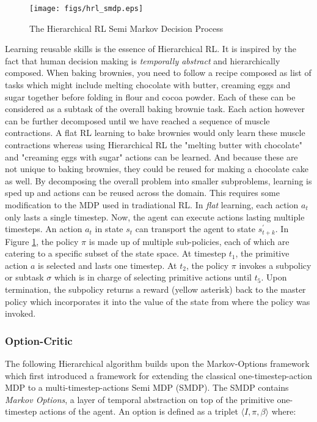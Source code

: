 \documentclass[notitlepage,a4paper,11pt]{article}
\begin{document}
\begin{figure}
	\vspace{-20pt}
	\begin{center}
		\texttt{[image: figs/hrl\_smdp.eps]}
	\end{center}
	\vspace{-20pt}
\caption{The Hierarchical RL Semi Markov Decision Process \protect\cite{ribas2011neural}} \label{fig:hrl_mdp}
\end{figure}

Learning reusable skills is the essence of Hierarchical RL. It is inspired by the fact that human decision making is \textit{temporally abstract} \cite{sutton1999between} and hierarchically composed. When baking brownies, you need to follow a recipe composed as list of tasks which might include melting chocolate with butter, creaming eggs and sugar together before folding in flour and cocoa powder. Each of these can be considered as a subtask of the overall baking brownie task. Each action however can be further decomposed until we have reached a sequence of muscle contractions. A flat RL learning to bake brownies would only learn these muscle contractions whereas using Hierarchical RL the "melting butter with chocolate" and "creaming eggs with sugar" actions can be learned. And because these are not unique to baking brownies, they could be reused for making a chocolate cake as well. By decomposing the overall problem into smaller subproblems, learning is sped up and actions can be reused across the domain. This requires some modification to the MDP used in tradiational RL. In \textit{flat} learning, each action $a_t$ only lasts a single timestep. Now, the agent can execute actions lasting multiple timesteps. An action $a_t$ in state $s_t$ can transport the agent to state $s^{\prime}_{t+k}$. In Figure \ref{fig:hrl_mdp}, the policy $\pi$ is made up of multiple sub-policies, each of which are catering to a specific subset of the state space. At timestep $t_1$, the primitive action $a$ is selected and lasts one timestep. At $t_2$, the policy $\pi$ invokes a subpolicy or subtask $\sigma$ which is in charge of selecting primitive actions until $t_5$. Upon termination, the subpolicy returns a reward (yellow asterisk) back to the master policy which incorporates it into the value of the state from where the policy was invoked.

\subsubsection{Option-Critic}
The following Hierarchical algorithm builds upon the Markov-Options framework \cite{sutton1999between} which first introduced a framework for extending the classical one-timestep-action MDP to a multi-timestep-actions Semi MDP (SMDP). The SMDP contains \textit{Markov Options}, a layer of temporal abstraction on top of the primitive one-timestep actions of the agent. An option is defined as a triplet $\langle I, \pi, \beta \rangle$ where:
\end{document}
